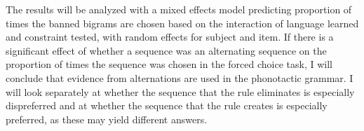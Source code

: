 The results will be analyzed with a mixed effects model predicting proportion
of times the banned bigrams are chosen based on the interaction of language learned
and constraint tested, with random effects for subject and item.
If there is a significant effect of whether a sequence was an
alternating sequence on the proportion of times the sequence was chosen in the
forced choice task, I will conclude that evidence from alternations are used in
the phonotactic grammar.
I will look separately at whether the sequence that the rule eliminates is
especially dispreferred and at whether the sequence that the rule creates is
especially preferred, as these may yield different answers.


